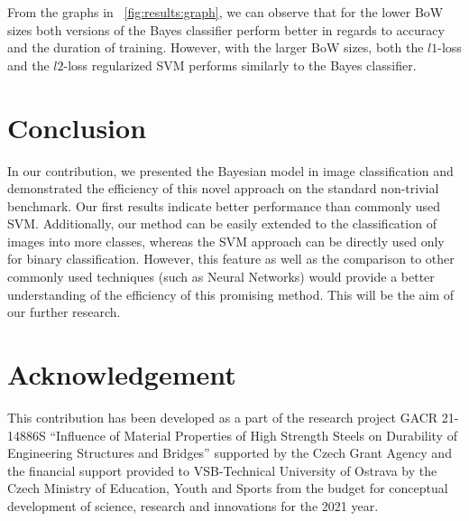 \documentclass{aip-cp}
\newcommand{\figref}[1]{\figurename~\ref{#1}}
\begin{document}
From the graphs in \figref{fig:results:graph}, we can observe that for the lower BoW sizes both versions of the Bayes classifier perform better in regards to accuracy and the duration of training. However, with the larger BoW sizes, both the $l1$-loss and the $l2$-loss regularized SVM performs similarly to the Bayes classifier.

\section{Conclusion}
In our contribution, we presented the Bayesian model in image classification and demonstrated the efficiency of this novel approach on the standard non-trivial benchmark. Our first results indicate better performance than commonly used SVM. Additionally, our method can be easily extended to the classification of images into more classes, whereas the SVM approach can be directly used only for binary classification. However, this feature as well as the comparison to other commonly used techniques (such as Neural Networks) would provide a better understanding of the efficiency of this promising method. This will be the aim of our further research.

\section{Acknowledgement}
This contribution has been developed as a part of the research project GACR 21-14886S ``Influence of Material Properties of High Strength Steels on Durability of Engineering Structures and Bridges'' supported by the Czech Grant Agency and the financial support provided to VSB-Technical University of Ostrava by the Czech Ministry of Education, Youth and Sports from the budget for conceptual development of science, research and innovations for the 2021 year.



\end{document}
